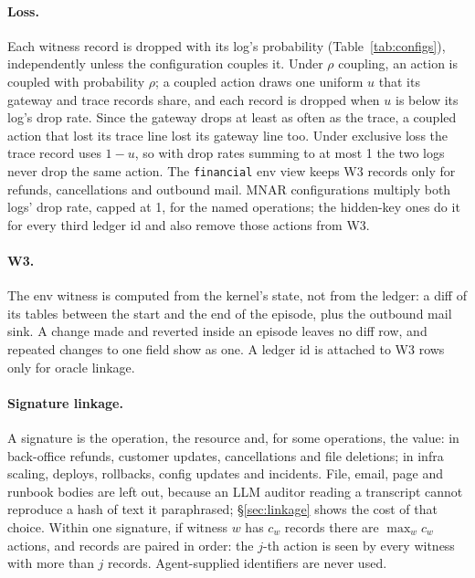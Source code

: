 \documentclass[11pt]{article}
\begin{document}
\paragraph{Loss.} Each witness record is dropped with its log's probability
(Table~\ref{tab:configs}), independently unless the configuration couples it.
Under $\rho$ coupling, an action is coupled with probability $\rho$; a coupled
action draws one uniform $u$ that its gateway and trace records share, and each
record is dropped when $u$ is below its log's drop rate. Since the gateway drops
at least as often as the trace, a coupled action that lost its trace line lost
its gateway line too. Under exclusive loss the trace record uses $1-u$, so with
drop rates summing to at most 1 the two logs never drop the same action. The
\texttt{financial} env view keeps W3 records only for refunds, cancellations and
outbound mail. MNAR configurations multiply both logs' drop rate, capped at 1,
for the named operations; the hidden-key ones do it for every third ledger id
and also remove those actions from W3.

\paragraph{W3.} The env witness is computed from the kernel's state, not from
the ledger: a diff of its tables between the start and the end of the episode,
plus the outbound mail sink. A change made and reverted inside an episode leaves
no diff row, and repeated changes to one field show as one. A ledger id is
attached to W3 rows only for oracle linkage.

\paragraph{Signature linkage.} A signature is the operation, the resource and,
for some operations, the value: in back-office refunds, customer updates,
cancellations and file deletions; in infra scaling, deploys, rollbacks, config
updates and incidents. File, email, page and runbook bodies are left out, because
an LLM auditor reading a transcript cannot reproduce a hash of text it
paraphrased; \S\ref{sec:linkage} shows the cost of that choice. Within one signature, if witness
$w$ has $c_w$ records there are $\max_w c_w$ actions, and records are paired in
order: the $j$-th action is seen by every witness with more than $j$ records.
Agent-supplied identifiers are never used.
\end{document}
